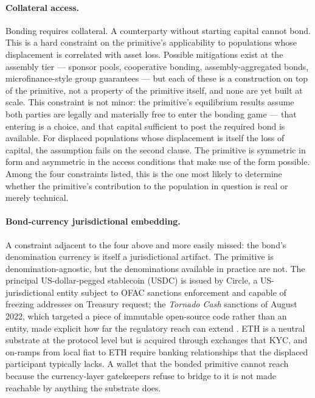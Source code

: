 \documentclass[11pt,a4paper]{article}
\theoremstyle{remark}
\begin{document}
\paragraph{Collateral access.}
Bonding requires collateral. A counterparty without starting
capital cannot bond. This is a hard constraint on the primitive's
applicability to populations whose displacement is correlated with
asset loss. Possible mitigations exist at the assembly tier ---
sponsor pools, cooperative bonding, assembly-aggregated bonds,
microfinance-style group guarantees --- but each of these is a
construction on top of the primitive, not a property of the
primitive itself, and none are yet built at scale. This
constraint is not minor: the primitive's equilibrium results
assume both parties are legally and materially free to enter the
bonding
game --- that entering is a choice, and that capital sufficient
to post the required bond is available. For displaced populations
whose displacement is itself the loss of capital, the assumption
fails on the second clause. The primitive is symmetric in form
and asymmetric in the access conditions that make use of the
form possible. Among the four constraints listed, this is the
one most likely to determine whether the primitive's contribution
to the population in question is real or merely technical.

\paragraph{Bond-currency jurisdictional embedding.}
A constraint adjacent to the four above and more easily missed:
the bond's denomination currency is itself a jurisdictional
artifact. The primitive is denomination-agnostic, but the
denominations available in practice are not. The principal
US-dollar-pegged stablecoin (USDC) is issued by Circle, a
US-jurisdictional entity subject to OFAC sanctions enforcement
and capable of freezing addresses on Treasury request; the
\emph{Tornado Cash} sanctions of August 2022, which targeted a
piece of immutable open-source code rather than an entity, made
explicit how far the regulatory reach can extend
\citep{ofac2022tornado, vanvalkenburgh2022tornado}. ETH is a
neutral substrate at the protocol level but is acquired through
exchanges that KYC, and on-ramps from local fiat to ETH require
banking relationships that the displaced participant typically
lacks. A wallet that the bonded primitive cannot reach because
the currency-layer gatekeepers refuse to bridge to it is not
made reachable by anything the substrate does.
\end{document}
